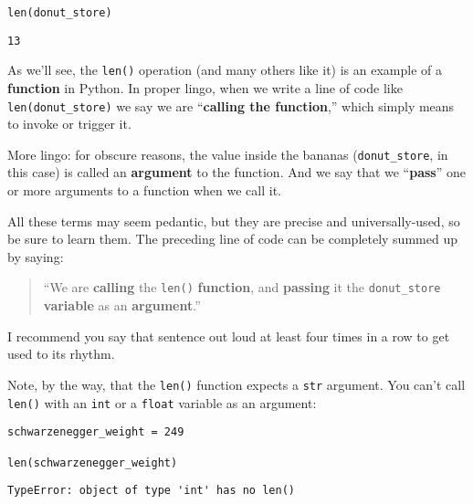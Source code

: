 \begin{Verbatim}[fontsize=\small,samepage=true,frame=single,framesep=3mm]
len(donut_store)
\end{Verbatim}
\begin{Verbatim}[fontsize=\small,samepage=true,frame=leftline,framesep=5mm,framerule=1mm]
13
\end{Verbatim}

As we'll see, the \texttt{len()} operation (and many others like it) is an
example of a \textbf{function} in Python. In proper lingo, when we write a line
of code like \texttt{len(donut\_store)} we say we are ``\textbf{calling the
function},'' which simply means to invoke or trigger it.

More lingo: for obscure reasons, the value inside the bananas
(\texttt{donut\_store}, in this case) is called an \textbf{argument} to the
function. And we say that we ``\textbf{pass}'' one or more arguments to a
function when we call it.

All these terms may seem pedantic, but they are precise and universally-used,
so be sure to learn them. The preceding line of code can be completely summed
up by saying:

\begin{quote}
``We are \textbf{calling} the \texttt{len()} \textbf{function},
and \textbf{passing} it the \texttt{donut\_store} \textbf{variable} as an
\textbf{argument}.''
\end{quote}

I recommend you say that sentence out loud at least four times in a row to get
used to its rhythm.

Note, by the way, that the \texttt{len()} function expects a \texttt{str}
argument. You can't call \texttt{len()} with an \texttt{int} or a
\texttt{float} variable as an argument:

\begin{Verbatim}[fontsize=\small,samepage=true,frame=single,framesep=3mm]
schwarzenegger_weight = 249

len(schwarzenegger_weight)
\end{Verbatim}

\begin{Verbatim}[fontsize=\small,samepage=true,frame=leftline,framesep=5mm,framerule=1mm]
TypeError: object of type 'int' has no len()
\end{Verbatim}

